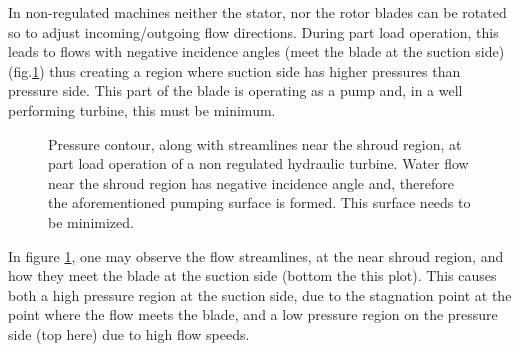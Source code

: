 In non-regulated machines neither the stator, nor the rotor blades can be rotated so to adjust incoming/outgoing flow directions. During part load operation, this leads to flows with negative incidence angles (meet the blade at the suction side) (fig.\ref{design-pumpS}) thus creating a region where suction side has higher pressures than pressure side. This part of the blade is operating as a pump and, in a well performing turbine, this must be minimum. 

\begin{figure}[h!]
\begin{minipage}[b]{1\linewidth}
 \centering
\end{minipage}
\caption{Pressure contour, along with streamlines near the shroud region, at part load operation of a non regulated hydraulic turbine. Water flow near the shroud region has negative incidence angle and, therefore the aforementioned pumping surface is formed. This surface needs to be minimized. }
\label{design-pumpS}
\end{figure}

In figure \ref{design-pumpS}, one may observe the flow streamlines, at the near shroud region, and how they meet the blade at the suction side (bottom the this plot). This causes both a high pressure region at the suction side, due to the stagnation point at the point where the flow meets the blade,  and a low pressure region on the pressure side (top here) due to high flow speeds.        

